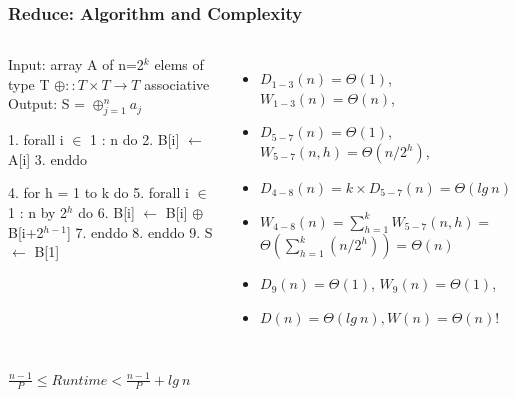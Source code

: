 \documentclass{beamer}
\renewcommand{\emph}[1]{\textcolor{structure}{#1}}
\newcommand{\emp}[1]{\textcolor{DikuRed}{ #1}}
\newcommand{\mymath}[1]{$ #1 $}
\newcommand{\myindx}[1]{_{#1}}
\newcommand{\myindu}[1]{^{#1}}
\begin{document}
\begin{frame}[fragile,t]
  \frametitle{Reduce: Algorithm and Complexity}


\begin{columns}
\begin{colorcode}[fontsize=\scriptsize]
Input:  array A of n=2\mymath{\myindu{k}} elems of type T
        \mymath{\oplus::T\times T\rightarrow T} associative
Output: S = \mymath{\oplus\myindx{j=1}\myindu{n} a\myindx{j}}

1.  \emph{forall i \mymath{\in} 1 : n do}
2.    B[i] \mymath{\leftarrow} A[i]
3.  \emph{enddo}

4.  \emp{for h = 1 to k do}
5.    \emph{forall i \mymath{\in} 1 : n by 2\mymath{\myindu{h}} do} 
6.      B[i] \mymath{\leftarrow} B[i] \mymath{\oplus} B[i+2\mymath{\myindu{h-1}}]
7.    \emph{enddo}
8.  \emp{enddo}
9.  S \mymath{\leftarrow} B[1]  
\end{colorcode}
\begin{itemize}
    \item $D_{1-3}(n) = \Theta(1)$, $W_{1-3}(n) = \Theta(n)$,
    \item $D_{5-7}(n) = \Theta(1)$, $W_{5-7}(n,h) = \Theta(n/2^h)$,
    \item $D_{4-8}(n) = k \times D_{5-7}(n) = \Theta(lg \ n)$
    \item $W_{4-8}(n) = \sum_{h=1}^k W_{5-7}(n,h) = $\\
          $\Theta(\sum_{h=1}^k (n/2^h) ) = \Theta(n)$
    \item $D_{9}(n) = \Theta(1)$, $W_{9}(n) = \Theta(1)$,\bigskip
    \item \emp{$D(n) = \Theta(lg \ n), W(n) = \Theta(n)$!}
\end{itemize}
\end{columns}
\bigskip


\begin{center}  
\emp{$\frac{n-1}{P} \leq  Runtime < \frac{n-1}{P} + lg \ n$}
\end{center}


\end{frame}
\end{document}

